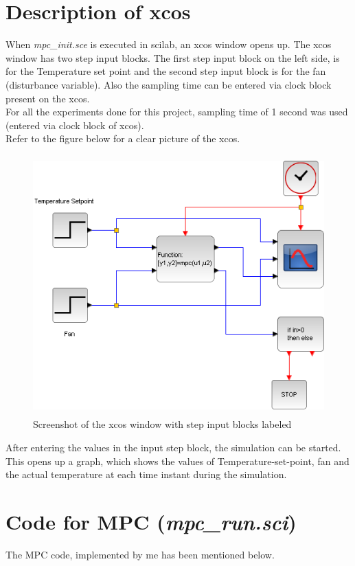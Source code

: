 \section{Description of xcos}
When \emph{mpc\_init.sce} is executed in scilab, an xcos window opens up. The xcos window has two step input blocks. The first step input block on the left side, is for the Temperature set point and the second step input block is for the fan (disturbance variable). Also the sampling time can be entered via clock block present on the xcos. \\
For all the experiments done for this project, sampling time of 1 second was used (entered via clock block of xcos). \\
Refer to the figure below for a clear picture of the xcos.
\begin{figure}[H]
\centering
  \includegraphics[width=12cm, height=10cm]{mpc/mpc_xcos.png}
  \caption{Screenshot of the xcos window with step input blocks labeled}
\end{figure}
After entering the values in the input step block, the simulation can be started. This opens up a graph, which shows the values of Temperature-set-point, fan and the actual temperature at each time instant during the simulation.

\section{Code for MPC (\emph{mpc\_run.sci})}
The MPC code, implemented by me has been mentioned below.


